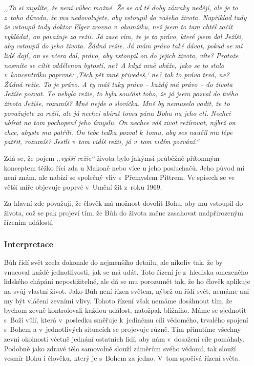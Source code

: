 \begin{enumerate}
{\textit{%
,,To si myslíte, že není vůbec možné. Že se od té doby zázraky nedějí, ale
je to z~toho důvodu, že mu nedovolujete, aby vstoupil do vašeho života.
Například tady že vstoupil tady doktor Elger zrovna v~okamžiku, než jsem to tam
chtěl začít vykládat, on považuje za režii. Já zase vím, že je to právo, které jsem
dal Ježíši, aby vstoupil do jeho života. Žádná režie. Já mám právo také dávat,
pokud se mi lidé dají, on se včera dal, právo, aby vstoupil on do jejich života,
víte? Protože nesmíte se cítit oddělenou bytostí, ne? A když mně ukáže, jako se
to stalo v~koncentráku poprvně: ,Těch pět mně přivedeš,` ne? tak to právo trvá,
ne? Žádná režie. To je právo. A ty máš taky právo -- každý má právo -- do života Ježíše
pozvat. To nebyla režie, to byla součást toho, že já jsem pozval do tvého
života Ježíše, rozumíš? Mně nejde o slovíčka. Mně by nemuselo vadit, že to
považujete za režii, ale já nechci ubírat tomu pánu Bohu na jeho cti. Nechci
ubírat na tom pochopení jeho úmyslu. On nechce váš zivot režírovat, nýbrž on
chce,
abyste mu patřili. On tebe teďka pozval k~tomu, aby ses naučil mu lépe patřit,
rozumíš? Jestli v~tom vidíš režii, já v~tom vidím pozvání.``
}

Zdá se, že pojem \textit{,,vyšší režie``} života bylo jakýmsi průběžně přítomným
konceptem těžko říci zda u Makoně nebo více u jeho posluchačů. Jeho původ mi
není znám, ale nabízí se společný vliv s~Přemyslem Pittrem.\cite{matous2014premysl}
Ve spisech se ve větší míře objevuje poprvé v~Umění žít\cite{KaMaUZ} z~roku 1969.

Za hlavní zde považuji, že člověk má možnost dovolit Bohu, aby mu vstoupil do
života, což se pak projeví tím, že Bůh do života začne zasahovat
nadpřirozeným řízením událostí.

}

\end{enumerate}

\subsubsection*{Interpretace}

Bůh řídí svět zcela dokonale do nejmenšího detailu, ale nikoliv tak, že by
vnucoval každé jednotlivosti, jak se má udát. Toto řízení je z~hlediska
omezeného lidského chápání nepostižitelné, ale dá se mu porozumět tak, že ho
člověk aplikuje na svůj vlastní život. Jako Bůh není řízen světem, nýbrž on řídí
svět, nemáme ani my být vláčeni zevními vlivy. Tohoto řízení však nemáme
dosáhnout tím, že bychom zevně kontrolovali každou událost, natožpak bližního.
Máme se sjednotit s~Boží vůlí, která v~posledku směřuje k~jedinému cíli
vědomého, trvalého spojení s~Bohem a v~jednotlivých situacích se projevuje
různě. Tím přinutíme všechny zevní okolnosti včetně jednání ostatních lidí, aby
nám v~dosažení cíle pomáhaly. Podobně jako zdravé tělo samovolně slouží záměrům
svého vědomí, tak slouží vesmír Bohu i člověku, který je s~Bohem za jedno. V~tom
spočívá řízení světa.

